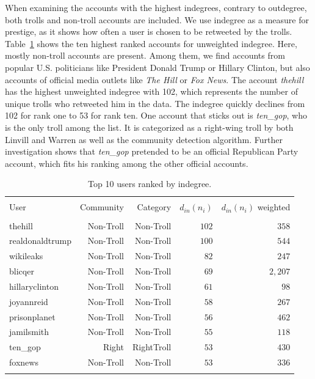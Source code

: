 \documentclass[12pt, titlepage=true, toc=bib]{scrartcl}
\begin{document}
When examining the accounts with the highest indegrees, contrary to outdegree, both trolls and non-troll accounts are included. We use indegree as a measure for prestige, as it shows how often a user is chosen to be retweeted by the trolls. Table~\ref{tab:in} shows the ten highest ranked accounts for unweighted indegree. Here, mostly non-troll accounts are present. Among them, we find  accounts from popular U.S. politicians like President Donald Trump or Hillary Clinton, but also accounts of official media outlets like \textit{The Hill} or \textit{Fox News}. The account \textit{thehill} has the highest unweighted indegree with 102, which represents the number of unique trolls who retweeted him in the data. The indegree quickly declines from 102 for rank one to 53 for rank ten. One account that sticks out is \textit{ten\_gop}, who is the only troll among the list. It is categorized as a right-wing troll by both Linvill and Warren \cite*{linvill_troll_2018} as well as the community detection algorithm. Further investigation shows that \textit{ten\_gop} pretended to be an official Republican Party account, which fits his ranking among the other official accounts. %

\begin{table}[!ht] \centering 
  \begin{tabular*}{.95\linewidth}{@{\extracolsep{\fill}} lrrrr} 
\\[-1.8ex]\hline 
\hline \\[-1.8ex] 
User & Community & Category & \( d_{in}(n_{i}) \) & \( d_{in}(n_{i}) \) weighted \\ 
\hline \\[-1.8ex] 
thehill & Non-Troll & Non-Troll & $102$ & $358$ \\ 
realdonaldtrump & Non-Troll & Non-Troll & $100$ & $544$ \\ 
wikileaks & Non-Troll & Non-Troll & $82$ & $247$ \\ 
blicqer & Non-Troll & Non-Troll & $69$ & $2,207$ \\ 
hillaryclinton & Non-Troll & Non-Troll & $61$ & $98$ \\ 
joyannreid & Non-Troll & Non-Troll & $58$ & $267$ \\ 
prisonplanet & Non-Troll & Non-Troll & $56$ & $462$ \\ 
jamilsmith & Non-Troll & Non-Troll & $55$ & $118$ \\ 
ten\_gop & Right & RightTroll & $53$ & $430$ \\ 
foxnews & Non-Troll & Non-Troll & $53$ & $336$ \\ 
\hline \\[-1.8ex] 
\end{tabular*} 
\caption[Indegree]{Top 10 users ranked by indegree.} 
  \label{tab:in} 
\end{table} 
\end{document}
